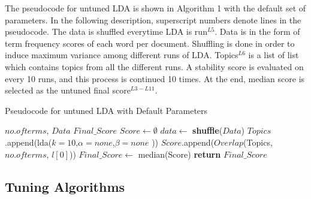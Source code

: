 \documentclass[10pt,conference]{IEEEtran}
\theoremstyle{break}
\begin{document}
The pseudocode for untuned LDA is shown in Algorithm 1 with the default set of parameters. In the following description, superscript numbers denote lines in the pseudocode. The data is shuffled everytime LDA is run$^{L5}$. Data is in the form of term frequency scores of each word per document. Shuffling is done in order  to  induce  maximum  variance  among  different  runs of LDA. Topics$^{L6}$ is a list of list which contains topics from all the different runs. A stability score is evaluated on every 10 runs, and this process is continued 10 times. At the end, median score is selected as the untuned final score$^{L3-L11}$.

\makeatletter
\algrenewcommand\ALG@beginalgorithmic{\footnotesize}
\algrenewcommand{}
\makeatother
\renewcommand{\algorithmicrequire}{\textbf{Input:}}
\renewcommand{\algorithmicensure}{\textbf{Output:}}
\begin{algorithm}[!htbp]
    \caption{Pseudocode for untuned LDA with Default Parameters}
    \begin{algorithmic}[1]
    \Require $no. of terms$, $Data$
    \Ensure $Final\_Score$    
        \State $Score \leftarrow \emptyset$
                \State $data \leftarrow$ \textbf{shuffle}($Data$)
                \State $Topics$.append(lda($k=10$,$\alpha=none$,$\beta=none$ ))
            \EndFor
            \State $Score$.append($Overlap$(Topics, $no. of terms$, $l[0]$))
        \EndFor
        \State $Final\_Score \leftarrow $ median(Score)
        \State \textbf{return} $Final\_Score$
    \EndFunction
    \end{algorithmic}
\end{algorithm}

\subsection{Tuning Algorithms}
\label{sect: tuning}
\end{document}
